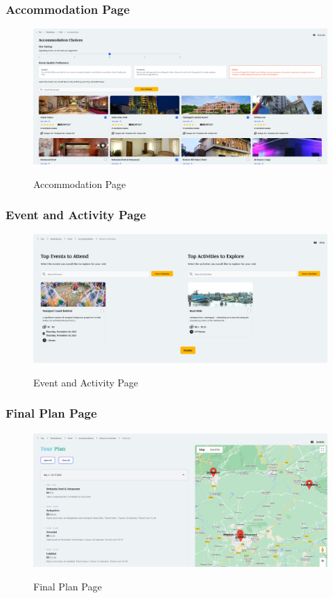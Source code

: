 \documentclass[12pt]{article}
\begin{document}
\subsubsection{Accommodation Page}
\begin{figure}[H]
    \centering
        \includegraphics[width=\textwidth]{Frontend SS/Hotel.png}
        \label{fig:Hotel}
    \caption{Accommodation Page}
\end{figure}

\newpage
\subsubsection{Event and Activity Page}
\begin{figure}[H]
    \centering
        \includegraphics[width=\textwidth]{Frontend SS/Event & Activity.png}
        \label{fig:EventandActivity}
    \caption{Event and Activity Page}
\end{figure}

\subsubsection{Final Plan Page}
\begin{figure}[H]
    \centering
        \includegraphics[width=\textwidth]{Frontend SS/Final Plan.png}
        \label{fig:FinalPlan}
    \caption{Final Plan Page}
\end{figure}
\newpage
\end{document}
